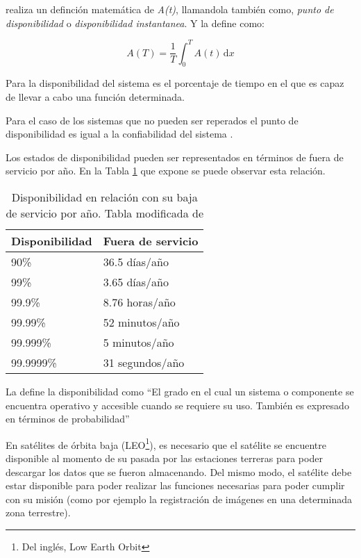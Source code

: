 \cite{FTDesign} realiza un definción matemática de \textit{A(t)}, llamandola también como,
\textit{punto de disponibilidad} o \textit{disponibilidad instantanea}. Y la define como:

$$A(T) = \frac{1}{T} \int_0^T \! A(t) \, \mathrm{d}x $$

Para \cite{Hanmer07} la disponibilidad del sistema es el porcentaje de tiempo en el que es capaz de
llevar a cabo una función determinada.

Para el caso de los sistemas que no pueden ser reperados el punto de disponibilidad es igual a la
confiabilidad del sistema \citep{FTDesign}.

Los estados de disponibilidad pueden ser representados en términos de fuera de servicio por año. En
la Tabla \ref{table:avalVSdowntime} que expone \cite{FTDesign} se puede observar esta relación.

\begin{table}[h]
  \centering
  \begin{tabular}{l|l}
    \hline
    Disponibilidad & Fuera de servicio \\ \hline
    90\%           & 36.5 días/año     \\
    99\%           & 3.65 días/año     \\
    99.9\%         & 8.76 horas/año    \\
    99.99\%        & 52 minutos/año    \\
    99.999\%       & 5 minutos/año     \\
    99.9999\%      & 31 segundos/año   \\ \hline
  \end{tabular}
  \caption{Disponibilidad en relación con su baja de servicio por año. Tabla
modificada de \protect\cite{FTDesign}}
  \label{table:avalVSdowntime}
\end{table}

La \cite{IEEE610.12} define la disponibilidad como ``El grado en el cual un sistema o
componente se encuentra operativo y accesible cuando se requiere su uso. También es expresado en
términos de probabilidad''

En satélites de órbita baja (LEO\footnote{Del inglés, Low Earth Orbit}), es necesario que el
satélite se encuentre disponible al momento de su pasada por las estaciones terreras para poder
descargar los datos que se fueron almacenando. Del mismo modo, el satélite debe estar disponible
para poder realizar las funciones necesarias para poder cumplir con su misión (como por ejemplo la
registración de imágenes en una determinada zona terrestre).

